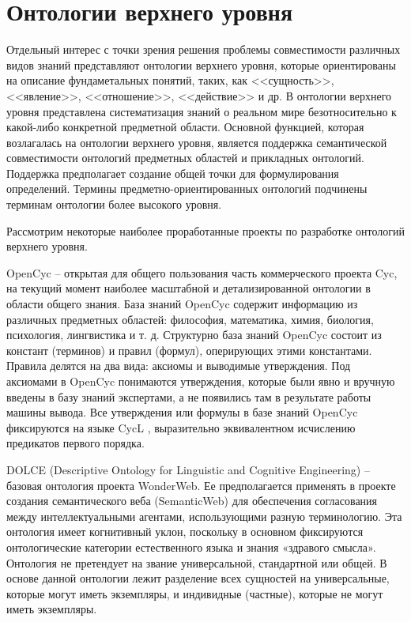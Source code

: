 \newpage
\section{Онтологии верхнего уровня}

Отдельный интерес с точки зрения решения проблемы совместимости различных видов знаний представляют онтологии верхнего уровня, которые ориентированы на описание фундаметальных понятий, таких, как <<сущность>>, <<явление>>, <<отношение>>, <<действие>> и др. В онтологии верхнего уровня представлена систематизация знаний о реальном мире безотносительно к какой-либо конкретной предметной области. Основной функцией, которая возлагалась на онтологии верхнего уровня, является поддержка семантической совместимости онтологий предметных областей и прикладных онтологий. Поддержка предполагает создание общей точки для формулирования определений. Термины предметно-ориентированных онтологий подчинены терминам онтологии более высокого уровня.

Рассмотрим некоторые наиболее проработанные проекты по разработке онтологий верхнего уровня.

OpenCyc \cite{OpenCyc} -- открытая для общего пользования часть коммерческого проекта Cyc, на текущий момент наиболее масштабной и детализированной онтологии в области общего знания. База знаний OpenCyc содержит информацию из различных предметных областей: философия, математика, химия, биология, психология, лингвистика и т. д. Структурно база знаний OpenCyc состоит из констант (терминов) и правил (формул), оперирующих этими константами. Правила делятся на два вида: аксиомы и выводимые утверждения. Под аксиомами в OpenCyc понимаются утверждения, которые были явно и вручную введены в базу знаний экспертами, а не появились там в результате работы машины вывода. Все утверждения или формулы в базе знаний OpenCyc фиксируются на языке CycL \cite{CycL2016}, выразительно эквивалентном исчислению предикатов первого порядка.

DOLCE (Descriptive Ontology for Linguistic and Cognitive Engineering) \cite{DOLCE} -- базовая онтология проекта WonderWeb. Ее предполагается применять в проекте создания семантического веба (SemanticWeb) для обеспечения согласования между интеллектуальными агентами, использующими разную терминологию. Эта онтология имеет когнитивный уклон, поскольку в основном фиксируются онтологические категории естественного языка и знания «здравого смысла». Онтология не претендует на звание универсальной, стандартной или общей. В основе данной онтологии лежит разделение всех сущностей на универсальные, которые могут иметь экземпляры, и индивидные (частные), которые не могут иметь экземпляры.

